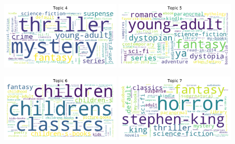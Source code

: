 \documentclass[handout]{beamer}
\begin{document}
\begin{frame}
\centering
  \includegraphics[width=0.45\textwidth]{../image/goodreads-topics-profiles-recommendations/tag-cloud-10-4.png} \hfill
    \includegraphics[width=0.45\textwidth]{../image/goodreads-topics-profiles-recommendations/tag-cloud-10-5.png}
    \vfill
    
      \includegraphics[width=0.45\textwidth]{../image/goodreads-topics-profiles-recommendations/tag-cloud-10-6.png} \hfill
        \includegraphics[width=0.45\textwidth]{../image/goodreads-topics-profiles-recommendations/tag-cloud-10-7.png}
\end{frame}
\end{document}
